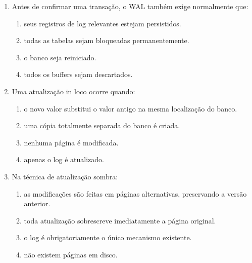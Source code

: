 \documentclass[12pt,a4paper]{article}
\begin{document}
\begin{enumerate}[label=\textbf{Q\arabic*.}]
\begin{enumerate}[label=\alph*)]
    \item o registro de log correspondente deve chegar ao disco antes da página alterada.
    \item a página deve ser escrita antes do log.
    \item o log só deve ser criado após uma falha.
    \item as transações não devem usar \texttt{COMMIT}.
\end{enumerate}

\item Antes de confirmar uma transação, o WAL também exige normalmente que:

\begin{enumerate}[label=\alph*)]
    \item seus registros de log relevantes estejam persistidos.
    \item todas as tabelas sejam bloqueadas permanentemente.
    \item o banco seja reiniciado.
    \item todos os buffers sejam descartados.
\end{enumerate}

\item Uma atualização in loco ocorre quando:

\begin{enumerate}[label=\alph*)]
    \item o novo valor substitui o valor antigo na mesma localização do banco.
    \item uma cópia totalmente separada do banco é criada.
    \item nenhuma página é modificada.
    \item apenas o log é atualizado.
\end{enumerate}

\item Na técnica de atualização sombra:

\begin{enumerate}[label=\alph*)]
    \item as modificações são feitas em páginas alternativas, preservando a versão anterior.
    \item toda atualização sobrescreve imediatamente a página original.
    \item o log é obrigatoriamente o único mecanismo existente.
    \item não existem páginas em disco.
\end{enumerate}


\end{enumerate}
\end{document}
